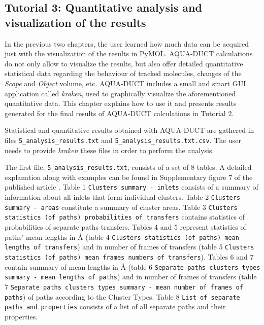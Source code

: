 \documentclass[9pt,tutorial]{livecoms}
\begin{document}
\subsection{Tutorial 3: Quantitative analysis and visualization of the results}

In the previous two chapters, the user learned how much data can be acquired just with the visualization of the results in PyMOL. AQUA-DUCT calculations do not only allow to visualize the results, but also offer detailed  quantitative statistical data regarding the behaviour of tracked molecules, changes of the \textit{Scope} and \textit{Object} volume, etc. AQUA-DUCT includes a small and smart GUI application called \textit{kraken}, used to graphically visualize the aforementioned quantitative data. This chapter explains how to use it and presents results generated for the final results of AQUA-DUCT calculations in Tutorial 2. 

Statistical and quantitative results obtained with AQUA-DUCT are gathered in files \texttt{5\_analysis\_results.txt} and \texttt{5\_analysis\_results.txt.csv}. The user needs to provide \textit{kraken} these files in order to perform the analysis.

The first file, \texttt{5\_analysis\_results.txt}, consists of a set of 8 tables. A detailed explanation along with examples can be found in Supplementary figure 7 of the published article \cite{Magdziarz2020}. 
Table 1 \texttt{Clusters summary - inlets} consists of a summary of information about all inlets that form individual clusters.
Table 2 \texttt{Clusters summary - areas} constitute a summary of cluster areas.
Table 3 \texttt{Clusters statistics (of paths) probabilities of transfers} contains statistics of probabilities of separate paths transfers. Tables 4 and 5 represent statistics of paths' mean lengths in Å (table 4 \texttt{Clusters statistics (of paths) mean lengths of transfers}) and in number of frames of transfers (table 5 \texttt{Clusters statistics (of paths) mean frames numbers of transfers}). Tables 6 and 7 contain summary of mean lengths in Å (table 6 \texttt{Separate paths clusters types summary - mean lengths of paths}) and in number of frames of transfers (table 7 \texttt{Separate paths clusters types summary - mean number of frames of paths}) of paths according to the Cluster Types. Table 8 \texttt{List of separate paths and properties} consists of a list of all separate paths and their properties. 
\end{document}
